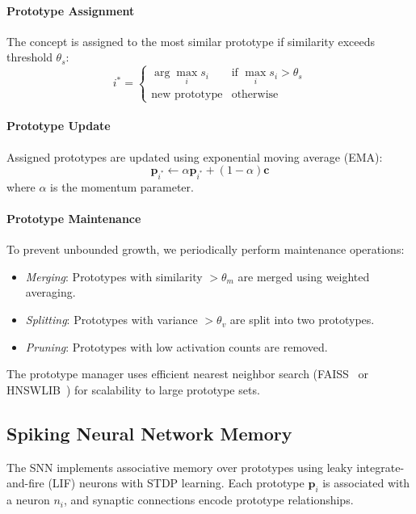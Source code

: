 \documentclass{article}
\begin{document}
\paragraph{Prototype Assignment} The concept is assigned to the most similar prototype if similarity exceeds threshold $\theta_s$:
\begin{equation}
i^* = \begin{cases}
\arg\max_i s_i & \text{if } \max_i s_i > \theta_s \\
\text{new prototype} & \text{otherwise}
\end{cases}
\end{equation}

\paragraph{Prototype Update} Assigned prototypes are updated using exponential moving average (EMA):
\begin{equation}
\mathbf{p}_{i^*} \leftarrow \alpha \mathbf{p}_{i^*} + (1 - \alpha) \mathbf{c}
\end{equation}
where $\alpha$ is the momentum parameter.

\paragraph{Prototype Maintenance} To prevent unbounded growth, we periodically perform maintenance operations:
\begin{itemize}
\item \emph{Merging}: Prototypes with similarity $> \theta_m$ are merged using weighted averaging.
\item \emph{Splitting}: Prototypes with variance $> \theta_v$ are split into two prototypes.
\item \emph{Pruning}: Prototypes with low activation counts are removed.
\end{itemize}

The prototype manager uses efficient nearest neighbor search (FAISS~\cite{johnson2019billion} or HNSWLIB~\cite{malkov2018efficient}) for scalability to large prototype sets.

\subsection{Spiking Neural Network Memory}
\label{sec:snn}

The SNN implements associative memory over prototypes using leaky integrate-and-fire (LIF) neurons with STDP learning. Each prototype $\mathbf{p}_i$ is associated with a neuron $n_i$, and synaptic connections encode prototype relationships.
\end{document}
